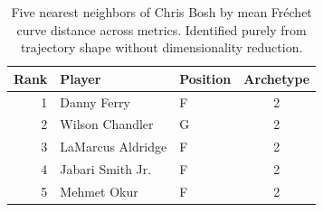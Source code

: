 \begin{table}[htbp]
  \centering\small
  \begin{tabular}{rllc}
    \toprule
    Rank & Player & Position & Archetype \\
    \midrule
    1 & Danny Ferry & F & 2 \\
    2 & Wilson Chandler & G & 2 \\
    3 & LaMarcus Aldridge & F & 2 \\
    4 & Jabari Smith Jr. & F & 2 \\
    5 & Mehmet Okur & F & 2 \\
    \bottomrule
  \end{tabular}
  \caption{Five nearest neighbors of Chris Bosh by mean Fr\'{e}chet curve distance across metrics. Identified purely from trajectory shape without dimensionality reduction.}
  \label{tab:Chris_Bosh_frechet_curve_neighbors}
\end{table}

